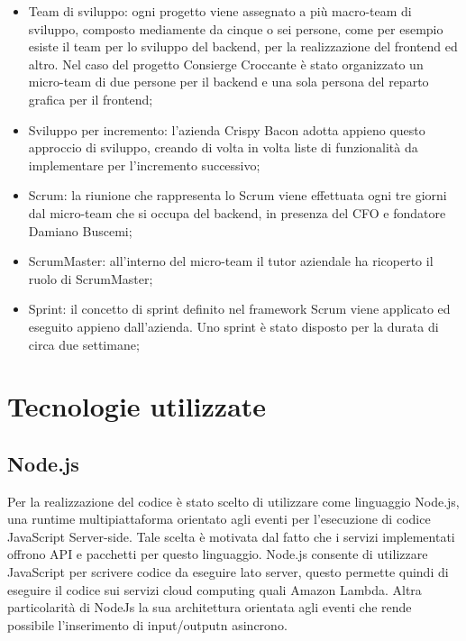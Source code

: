 \begin{itemize}
    \item Team di sviluppo: ogni progetto viene assegnato a più macro-team di sviluppo, composto mediamente da cinque o sei persone, come per esempio esiste il team per lo sviluppo del backend, per la realizzazione del frontend ed altro. Nel caso del progetto Consierge Croccante è stato organizzato un micro-team di due persone per il backend e una sola persona del reparto grafica per il frontend;
    
    \item Sviluppo per incremento: l’azienda Crispy Bacon adotta appieno questo approccio di sviluppo, creando di volta in volta liste di funzionalità da implementare per l'incremento successivo;
    
    \item Scrum: la riunione che rappresenta lo Scrum viene effettuata ogni tre giorni dal micro-team che si occupa del backend, in presenza del CFO e fondatore Damiano Buscemi;
    
    \item ScrumMaster: all'interno del micro-team il tutor aziendale ha ricoperto il ruolo di ScrumMaster;
    
    \item Sprint: il concetto di sprint definito nel framework Scrum viene applicato ed eseguito appieno dall'azienda. Uno sprint è stato disposto per la durata di circa due settimane;
    
\end{itemize}

\section{Tecnologie utilizzate}
\subsection{Node.js}
\label{nodejs}
Per la realizzazione del codice è stato scelto di utilizzare come linguaggio Node.js, una runtime multipiattaforma orientato agli eventi per l'esecuzione di codice JavaScript Server-side. Tale scelta è motivata dal fatto che i servizi implementati offrono API e pacchetti per questo linguaggio. Node.js consente di utilizzare JavaScript per scrivere codice da eseguire lato server, questo permette quindi di eseguire il codice sui servizi cloud computing quali Amazon Lambda. Altra particolarità di NodeJs la sua architettura orientata agli eventi che rende possibile l’inserimento di input/outputn asincrono. 

